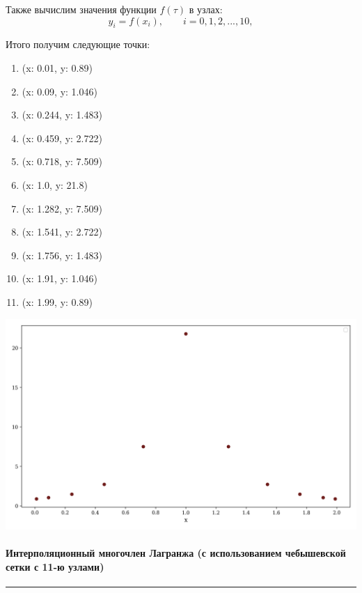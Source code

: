 \documentclass[a4paper, 14pt]{extarticle}
\begin{document}
Также вычислим значения функции $f(\tau)$ в узлах:
\begin{equation*}
  y_i = f(x_i), \qquad i=0,1,2,...,10,
\end{equation*}

Итого получим следующие точки:
\begin{multicols}{3}
  \begin{enumerate}[itemsep=5pt]
    \item (x: 0.01, y: 0.89)
    \item (x: 0.09, y: 1.046)
    \item (x: 0.244, y: 1.483)
    \item (x: 0.459, y: 2.722)
    \item (x: 0.718, y: 7.509)
    \item (x: 1.0, y: 21.8)
    \item (x: 1.282, y: 7.509)
    \item (x: 1.541, y: 2.722)
    \item (x: 1.756, y: 1.483)
    \item (x: 1.91, y: 1.046)
    \item (x: 1.99, y: 0.89)    
  \end{enumerate} 
\end{multicols}

\vspace{10pt}

\begin{center}
  \includegraphics[width=1\textwidth]{scatter2}
\end{center}

\newpage

\paragraph*{Интерполяционный многочлен Лагранжа (с использованием чебышевской сетки с 11-ю узлами)}\vspace{-20pt}\rule{\linewidth}{0.1mm}
\end{document}
